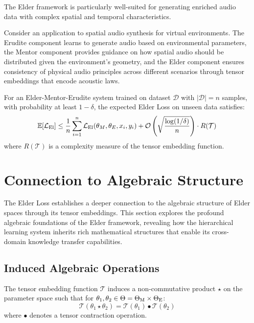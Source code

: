 The Elder framework is particularly well-suited for generating enriched audio data with complex spatial and temporal characteristics.

\begin{example}
Consider an application to spatial audio synthesis for virtual environments. The Erudite component learns to generate audio based on environmental parameters, the Mentor component provides guidance on how spatial audio should be distributed given the environment's geometry, and the Elder component ensures consistency of physical audio principles across different scenarios through tensor embeddings that encode acoustic laws.
\end{example}

\begin{theorem}
For an Elder-Mentor-Erudite system trained on dataset $\mathcal{D}$ with $|\mathcal{D}| = n$ samples, with probability at least $1-\delta$, the expected Elder Loss on unseen data satisfies:
\begin{equation}
\mathbb{E}[\mathcal{L}_{\text{El}}] \leq \frac{1}{n}\sum_{i=1}^n \mathcal{L}_{\text{El}}(\theta_M, \theta_E, x_i, y_i) + \mathcal{O}\left(\sqrt{\frac{\log(1/\delta)}{n}}\right) \cdot R(\mathcal{T})
\end{equation}
where $R(\mathcal{T})$ is a complexity measure of the tensor embedding function.
\end{theorem}

\section{Connection to Algebraic Structure}

The Elder Loss establishes a deeper connection to the algebraic structure of Elder spaces through its tensor embeddings. This section explores the profound algebraic foundations of the Elder framework, revealing how the hierarchical learning system inherits rich mathematical structures that enable its cross-domain knowledge transfer capabilities.

\subsection{Induced Algebraic Operations}

\begin{proposition}
The tensor embedding function $\mathcal{T}$ induces a non-commutative product $\star$ on the parameter space such that for $\theta_1, \theta_2 \in \Theta = \Theta_{\text{M}} \times \Theta_{\text{E}}$:
\begin{equation}
\mathcal{T}(\theta_1 \star \theta_2) = \mathcal{T}(\theta_1) \bullet \mathcal{T}(\theta_2)
\end{equation}
where $\bullet$ denotes a tensor contraction operation.
\end{proposition}

